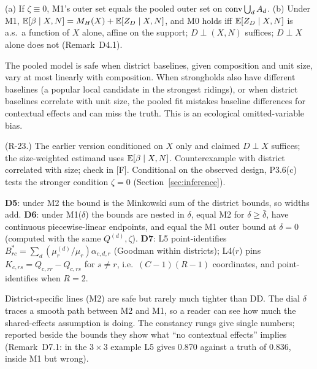 \begin{result}\label{res:d4}
 (a) If $\zeta\equiv0$, M1's outer set equals the pooled outer set
on $\operatorname{conv}\bigcup_dA_d$. (b) Under M1, $\mathbb E[\beta\mid X,N]=M_H(X)+\mathbb E[Z_D\mid X,N]$,
and M0 holds iff $\mathbb E[Z_D\mid X,N]$ is a.s.\ a function of $X$ alone, affine on
the support; $D\perp(X,N)$ suffices; $D\perp X$ alone does not (Remark~D4.1).
\end{result}
\begin{plain}
The pooled model is safe when district baselines, given composition and unit
size, vary at most linearly with composition. When strongholds also have
different baselines (a popular local candidate in the strongest ridings), or when
district baselines correlate with unit size, the pooled fit mistakes baseline
differences for contextual effects and can miss the truth. This is an
ecological omitted-variable bias.
\end{plain}
\begin{revnote}
(R-23.) The earlier version conditioned on $X$ only and claimed $D\perp X$
suffices; the size-weighted estimand uses $\mathbb E[\beta\mid X,N]$. Counterexample
with district correlated with size; check in  [F].
Conditional on the observed design, P3.6(c) tests the stronger condition
$\zeta=0$ (Section~\ref{sec:inference}).
\end{revnote}

\begin{result}
\textbf{D5}: under M2 the bound is the Minkowski sum of the district bounds, so
widths add.
\textbf{D6}: under M1($\delta$) the bounds are nested in $\delta$, equal M2 for
$\delta\ge\bar\delta$, have continuous piecewise-linear endpoints, and equal
the M1 outer bound at $\delta=0$ (computed with the same $Q^{(d)},\zeta$).
\textbf{D7}: L5 point-identifies $B^*_{rc}=\sum_d(\mu^{(d)}_r/\mu_r)\alpha_{c,d,r}$
(Goodman within districts); L4($r$) pins $K_{c,rs}=Q_{c,rr}-Q_{c,rs}$ for
$s\ne r$, i.e.\ $(C-1)(R-1)$ coordinates, and point-identifies when $R=2$.
\end{result}
\begin{plain}
District-specific lines (M2) are safe but rarely much tighter than DD. The dial
$\delta$ traces a smooth path between M2 and M1, so a reader can see how much
the shared-effects assumption is doing. The constancy rungs give single numbers;
reported beside the bounds they show what ``no contextual effects'' implies
(Remark~D7.1: in the $3\times3$ example L5 gives 0.870 against a truth of
0.836, inside M1 but wrong).
\end{plain}
